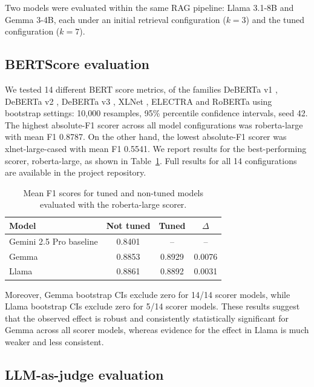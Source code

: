\documentclass[fleqn,moreauthors,10pt]{ds_report}
\begin{document}
Two models were evaluated within the same RAG pipeline: Llama 3.1-8B
and Gemma 3-4B, each under an initial retrieval configuration ($k=3$)
and the tuned configuration ($k=7$).

\subsection*{BERTScore evaluation}

We tested 14 different BERT score metrics, of the families DeBERTa v1 \cite{he2021deberta}, DeBERTa v2 \cite{he2021debertav2_hf}, DeBERTa v3 \cite{he2021debertav3}, XLNet \cite{yang2019xlnet}, ELECTRA \cite{clark2020electra} and RoBERTa \cite{liu2019roberta} using bootstrap settings: 10,000 resamples, 95\% percentile confidence intervals, seed 42. The highest absolute-F1 scorer across all model configurations was roberta-large with mean F1 0.8787. On the other hand, the lowest absolute-F1 scorer was xlnet-large-cased with mean F1 0.5541. We report results for the best-performing scorer, roberta-large,
as shown in Table~\ref{tab:tuned_vs_not_tuned}. Full results for
all 14 configurations are available in the project repository.

\begin{table}[ht]
\centering
\small
\setlength{\tabcolsep}{6pt}

\begin{tabular}{lccc}
\hline
\textbf{Model} & \textbf{Not tuned} & \textbf{Tuned} & \textbf{$\Delta$} \\
\hline
Gemini 2.5 Pro baseline & 0.8401 & -- & -- \\
Gemma            & 0.8853 & 0.8929 & 0.0076 \\
Llama            & 0.8861 & 0.8892 & 0.0031 \\
\hline
\end{tabular}

\caption{Mean F1 scores for tuned and non-tuned models evaluated with the roberta-large scorer.}
\label{tab:tuned_vs_not_tuned}
\end{table}

Moreover, Gemma bootstrap CIs exclude zero for 14/14 scorer models, while Llama bootstrap CIs exclude zero for 5/14 scorer models. These results suggest that the observed effect is robust and consistently statistically significant for Gemma across all scorer models, whereas evidence for the effect in Llama is much weaker and less consistent.


\subsection*{LLM-as-judge evaluation}
\end{document}
